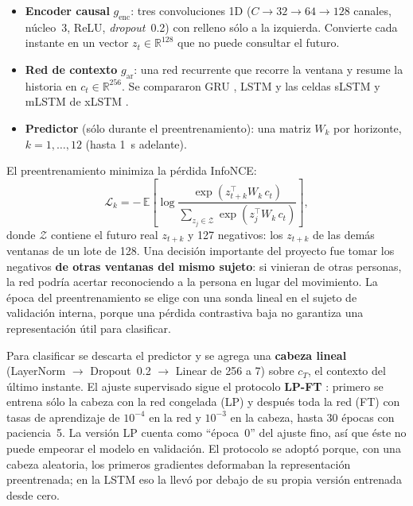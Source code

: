 \documentclass[letterpaper,11pt]{article}
\begin{document}
\begin{itemize}
  \item \textbf{Encoder causal} $g_{\text{enc}}$: tres convoluciones 1D ($C \to 32 \to 64 \to 128$ canales, núcleo~3, ReLU, \emph{dropout}~0.2) con relleno sólo a la izquierda. Convierte cada instante en un vector $z_t \in \mathbb{R}^{128}$ que no puede consultar el futuro.
  \item \textbf{Red de contexto} $g_{\text{ar}}$: una red recurrente que recorre la ventana y resume la historia en $c_t \in \mathbb{R}^{256}$. Se compararon GRU \parencite{cho2014}, LSTM \parencite{hochreiter1997} y las celdas sLSTM y mLSTM de xLSTM \parencite{beck2024}.
  \item \textbf{Predictor} (sólo durante el preentrenamiento): una matriz $W_k$ por horizonte, $k = 1,\dots,12$ (hasta 1~s adelante).
\end{itemize}

El preentrenamiento minimiza la pérdida InfoNCE:
\begin{equation}
  \mathcal{L}_k = -\,\mathbb{E}\left[\log \frac{\exp\!\left(z_{t+k}^{\top} W_k\, c_t\right)}{\sum_{z_j \in \mathcal{Z}} \exp\!\left(z_j^{\top} W_k\, c_t\right)}\right],
  \label{eq:infonce}
\end{equation}
donde $\mathcal{Z}$ contiene el futuro real $z_{t+k}$ y 127 negativos: los $z_{t+k}$ de las demás ventanas de un lote de 128. Una decisión importante del proyecto fue tomar los negativos \textbf{de otras ventanas del mismo sujeto}: si vinieran de otras personas, la red podría acertar reconociendo a la persona en lugar del movimiento. La época del preentrenamiento se elige con una sonda lineal en el sujeto de validación interna, porque una pérdida contrastiva baja no garantiza una representación útil para clasificar.

Para clasificar se descarta el predictor y se agrega una \textbf{cabeza lineal} (LayerNorm $\to$ Dropout~0.2 $\to$ Linear de 256 a 7) sobre $c_T$, el contexto del último instante. El ajuste supervisado sigue el protocolo \textbf{LP-FT} \parencite{kumar2022}: primero se entrena sólo la cabeza con la red congelada (LP) y después toda la red (FT) con tasas de aprendizaje de $10^{-4}$ en la red y $10^{-3}$ en la cabeza, hasta 30 épocas con paciencia~5. La versión LP cuenta como ``época~0'' del ajuste fino, así que éste no puede empeorar el modelo en validación. El protocolo se adoptó porque, con una cabeza aleatoria, los primeros gradientes deformaban la representación preentrenada; en la LSTM eso la llevó por debajo de su propia versión entrenada desde cero.
\end{document}
